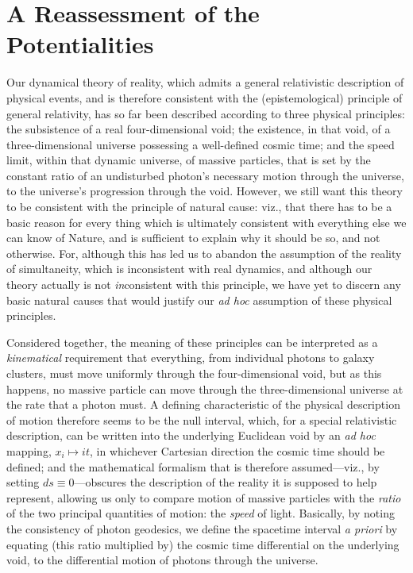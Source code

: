 \section{A Reassessment of the Potentialities\label{sec_ARP}}
Our dynamical theory of reality, which admits a general relativistic description of physical events, and is therefore consistent with the (epistemological) principle of general relativity, has so far been described according to three physical principles: the subsistence of a real four-dimensional void; the existence, in that void, of a three-dimensional universe possessing a well-defined cosmic time; and the speed limit, within that dynamic universe, of massive particles, that is set by the constant ratio of an undisturbed photon's necessary motion through the universe, to the universe's progression through the void. However, we still want this theory to be consistent with the principle of natural cause: viz., that there has to be a basic reason for every thing which is ultimately consistent with everything else we can know of Nature, and is sufficient to explain why it should be so, and not otherwise. For, although this has led us to abandon the assumption of the reality of simultaneity, which is inconsistent with real dynamics, and although our theory actually is not \textit{in}consistent with this principle, we have yet to discern any basic natural causes that would justify our \textit{ad hoc} assumption of these physical principles.

Considered together, the meaning of these principles can be interpreted as a \textit{kinematical} requirement that everything, from individual photons to galaxy clusters, must move uniformly through the four-dimensional void, but as this happens, no massive particle can move through the three-dimensional universe at the rate that a photon must. A defining characteristic of the physical description of motion therefore seems to be the null interval, which, for a special relativistic description, can be written into the underlying Euclidean void by an \textit{ad hoc} mapping, $x_i\mapsto{it}$, in whichever Cartesian direction the cosmic time should be defined; and the mathematical formalism that is therefore assumed---viz., by setting $ds\equiv0$---obscures the description of the reality it is supposed to help represent, allowing us only to compare motion of massive particles with the \textit{ratio} of the two principal quantities of motion: the \textit{speed} of light. Basically, by noting the consistency of photon geodesics, we define the spacetime interval \textit{a priori} by equating (this ratio multiplied by) the cosmic time differential on the underlying void, to the differential motion of photons through the universe.

